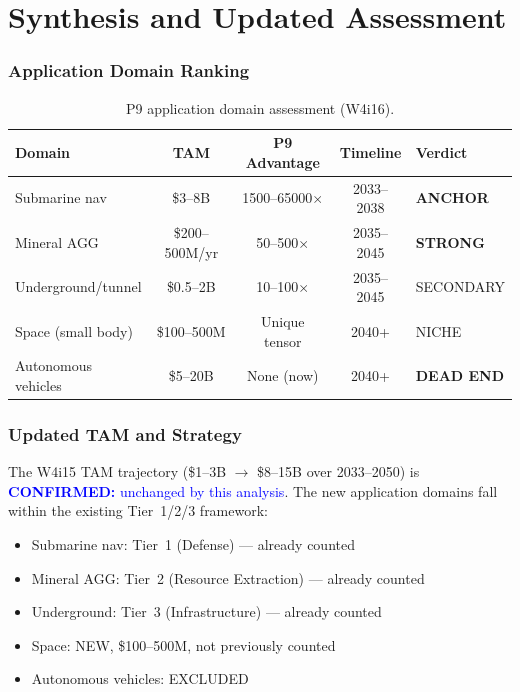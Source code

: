 \documentclass[11pt]{article}
\theoremstyle{definition}
\theoremstyle{remark}
\newcommand{\confirmed}[1]{\textcolor{blue}{\textbf{CONFIRMED:} #1}}
\begin{document}
\part{Synthesis and Updated Assessment}
\label{part:synthesis}

\section{Application Domain Ranking}
\label{sec:domain-ranking}

\begin{table}[H]
\centering
\caption{P9 application domain assessment (W4i16).}
\label{tab:domain-ranking}
\begin{tabular}{@{}p{2.8cm}cccp{3.5cm}@{}}
\toprule
Domain & TAM & P9 Advantage & Timeline & Verdict \\
\midrule
Submarine nav & \$3--8B & 1500--65000$\times$ & 2033--2038 & \textbf{ANCHOR} \\
Mineral AGG & \$200--500M/yr & 50--500$\times$ & 2035--2045 & \textbf{STRONG} \\
Underground/tunnel & \$0.5--2B & 10--100$\times$ & 2035--2045 & SECONDARY \\
Space (small body) & \$100--500M & Unique tensor & 2040+ & NICHE \\
Autonomous vehicles & \$5--20B & None (now) & 2040+ & \textbf{DEAD END} \\
\bottomrule
\end{tabular}
\end{table}

\section{Updated TAM and Strategy}
\label{sec:updated-tam}

The W4i15 TAM trajectory (\$1--3B $\to$ \$8--15B over 2033--2050)
is \confirmed{unchanged by this analysis}. The new application
domains fall within the existing Tier~1/2/3 framework:
\begin{itemize}[nosep]
  \item Submarine nav: Tier~1 (Defense) --- already counted
  \item Mineral AGG: Tier~2 (Resource Extraction) --- already counted
  \item Underground: Tier~3 (Infrastructure) --- already counted
  \item Space: NEW, \$100--500M, not previously counted
  \item Autonomous vehicles: EXCLUDED
\end{itemize}
\end{document}
